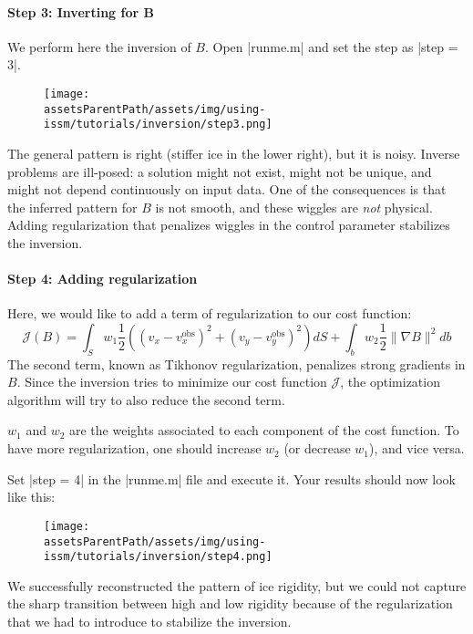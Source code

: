 \paragraph{Step 3: Inverting for B}
We perform here the inversion of $B$. Open \lstinlinebg|runme.m| and set the step as \lstinlinebg|step = 3|.
\begin{figure}[H]
	\begin{center}
		\texttt{[image: \\assetsParentPath/assets/img/using-issm/tutorials/inversion/step3.png]}
	\end{center}
\end{figure}
The general pattern is right (stiffer ice in the lower right), but it is noisy. Inverse problems are ill-posed: a solution might not exist, might not be unique, and might not depend continuously on input data. One of the consequences is that the inferred pattern for $B$ is not smooth, and these wiggles are \emph{not} physical. Adding regularization that penalizes wiggles in the control parameter stabilizes the inversion.

\paragraph{Step 4: Adding regularization}
Here, we would like to add a term of regularization to our cost function:
\begin{equation}
	{\mathcal J\left(B\right)}
	=
	\int_{S} w_1 \dfrac{1}{2}\left(
	\left(v_x-v_x^{\text{obs}}\right)^{2}
	+\left(v_y-v_y^{\text{obs}}\right)^{2}
	\right) dS
	+
	\int_{b} w_2 \dfrac{1}{2}
	\|\nabla B \|^{2}
	db
\end{equation}
The second term, known as Tikhonov regularization, penalizes strong gradients in $B$. Since the inversion tries to minimize our cost function $\mathcal J$, the optimization algorithm will try to also reduce the second term.

$w_1$ and $w_2$ are the weights associated to each component of the cost function. To have more regularization, one should increase $w_2$ (or decrease $w_1$), and vice versa.

Set \lstinlinebg|step = 4| in the \lstinlinebg|runme.m| file and execute it. Your results should now look like this:
\begin{figure}[H]
	\begin{center}
		\texttt{[image: \\assetsParentPath/assets/img/using-issm/tutorials/inversion/step4.png]}
	\end{center}
\end{figure}
We successfully reconstructed the pattern of ice rigidity, but we could not capture the sharp transition between high and low rigidity because of the regularization that we had to introduce to stabilize the inversion.
